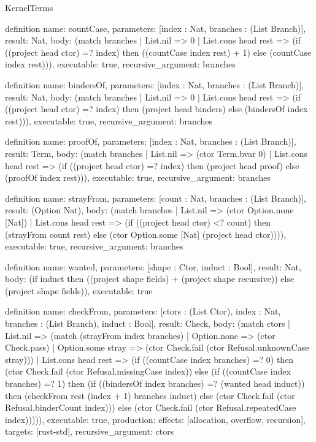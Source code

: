 \begin{lexlean}{KernelTerms}
\begin{semanticmodule}
definition{
  name: countCase,
  parameters: [index : Nat, branches : (List Branch)],
  result: Nat,
  body: (match branches
    | List.nil => 0
    | List.cons head rest => (if ((project head ctor) =? index) then ((countCase index rest) + 1) else (countCase index rest))),
  executable: true,
  recursive_argument: branches
}

definition{
  name: bindersOf,
  parameters: [index : Nat, branches : (List Branch)],
  result: Nat,
  body: (match branches
    | List.nil => 0
    | List.cons head rest => (if ((project head ctor) =? index) then (project head binders) else (bindersOf index rest))),
  executable: true,
  recursive_argument: branches
}

definition{
  name: proofOf,
  parameters: [index : Nat, branches : (List Branch)],
  result: Term,
  body: (match branches
    | List.nil => (ctor Term.bvar 0)
    | List.cons head rest => (if ((project head ctor) =? index) then (project head proof) else (proofOf index rest))),
  executable: true,
  recursive_argument: branches
}

definition{
  name: strayFrom,
  parameters: [count : Nat, branches : (List Branch)],
  result: (Option Nat),
  body: (match branches
    | List.nil => (ctor Option.none [Nat])
    | List.cons head rest => (if ((project head ctor) <? count) then (strayFrom count rest) else (ctor Option.some [Nat] (project head ctor)))),
  executable: true,
  recursive_argument: branches
}

definition{
  name: wanted,
  parameters: [shape : Ctor, induct : Bool],
  result: Nat,
  body: (if induct then ((project shape fields) + (project shape recursive)) else (project shape fields)),
  executable: true
}

definition{
  name: checkFrom,
  parameters: [ctors : (List Ctor), index : Nat, branches : (List Branch), induct : Bool],
  result: Check,
  body: (match ctors
    | List.nil => (match (strayFrom index branches)
      | Option.none => (ctor Check.pass)
      | Option.some stray => (ctor Check.fail (ctor Refusal.unknownCase stray)))
    | List.cons head rest => (if ((countCase index branches) =? 0) then (ctor Check.fail (ctor Refusal.missingCase index)) else (if ((countCase index branches) =? 1) then (if ((bindersOf index branches) =? (wanted head induct)) then (checkFrom rest (index + 1) branches induct) else (ctor Check.fail (ctor Refusal.binderCount index))) else (ctor Check.fail (ctor Refusal.repeatedCase index))))),
  executable: true,
  production: {effects: [allocation, overflow, recursion], targets: [rust-std]},
  recursive_argument: ctors
}


\end{semanticmodule}
\end{lexlean}
